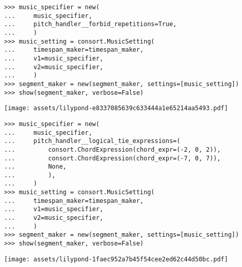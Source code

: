 \begin{singlespacing}
\vspace{-0.5\baselineskip}
\begin{lstlisting}
>>> music_specifier = new(
...     music_specifier,
...     pitch_handler__forbid_repetitions=True,
...     )
>>> music_setting = consort.MusicSetting(
...     timespan_maker=timespan_maker,
...     v1=music_specifier,
...     v2=music_specifier,
...     )
>>> segment_maker = new(segment_maker, settings=[music_setting])
>>> show(segment_maker, verbose=False)
\end{lstlisting}
\noindent\texttt{[image: assets/lilypond-e8337085639c633444a1e65214aa5493.pdf]}
\end{singlespacing}

\begin{comment}
<abjad>[stylesheet=../consort.ily]
music_specifier = new(
    music_specifier,
    pitch_handler__logical_tie_expressions=(
        consort.ChordExpression(chord_expr=(-2, 0, 2)),
        consort.ChordExpression(chord_expr=(-7, 0, 7)),
        None,
        ),
    )
music_setting = consort.MusicSetting(
    timespan_maker=timespan_maker,
    v1=music_specifier,
    v2=music_specifier,
    )
segment_maker = new(segment_maker, settings=[music_setting])
show(segment_maker, verbose=False)
</abjad>
\end{comment}

\begin{singlespacing}
\vspace{-0.5\baselineskip}
\begin{lstlisting}
>>> music_specifier = new(
...     music_specifier,
...     pitch_handler__logical_tie_expressions=(
...         consort.ChordExpression(chord_expr=(-2, 0, 2)),
...         consort.ChordExpression(chord_expr=(-7, 0, 7)),
...         None,
...         ),
...     )
>>> music_setting = consort.MusicSetting(
...     timespan_maker=timespan_maker,
...     v1=music_specifier,
...     v2=music_specifier,
...     )
>>> segment_maker = new(segment_maker, settings=[music_setting])
>>> show(segment_maker, verbose=False)
\end{lstlisting}
\noindent\texttt{[image: assets/lilypond-1faec952a7b45f54cee2ed62c44d50bc.pdf]}
\end{singlespacing}

\begin{comment}
<abjad>[stylesheet=../consort.ily]
segment_maker = new(
    segment_maker,
    settings=[music_setting, other_music_setting],
    )
show(segment_maker, verbose=False)
</abjad>
\end{comment}

